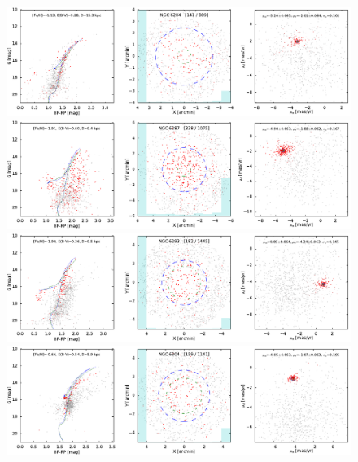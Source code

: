 \documentclass[usenatbib]{mnras}
\begin{document}
\clearpage\begin{figure}
\contcaption{}
\includegraphics{figs/NGC_6284.pdf}
\includegraphics{figs/NGC_6287.pdf}
\includegraphics{figs/NGC_6293.pdf}
\includegraphics{figs/NGC_6304.pdf}
\end{figure}
\end{document}
